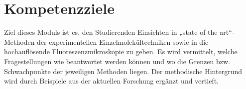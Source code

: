 \section{Kompetenzziele}
Ziel dieses Moduls ist es, den Studierenden Einsichten in „state of the art“-Methoden der experimentellen Einzelmolekültechniken sowie in die hochauflösende Fluoreszenzmikroskopie zu geben. Es wird vermittelt, welche Fragestellungen wie beantwortet werden können und wo die Grenzen bzw. Schwachpunkte der jeweiligen Methoden liegen. Der methodische Hintergrund wird durch Beispiele aus der aktuellen Forschung ergänzt und vertieft.